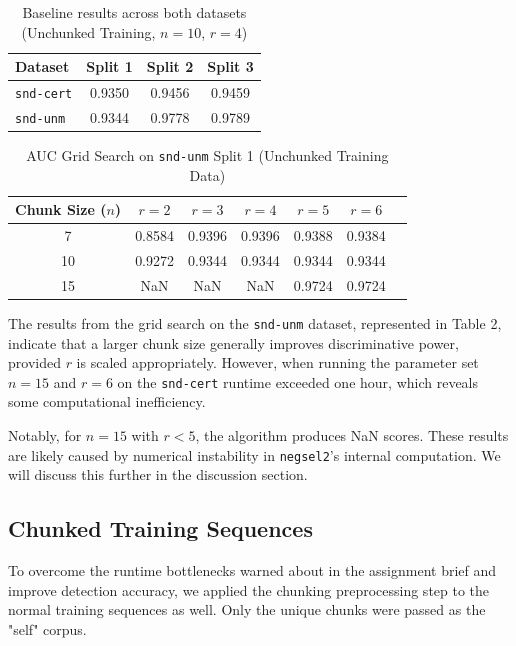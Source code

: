 \documentclass{article}
\begin{document}
\begin{table}[h]
\centering
\caption{Baseline results across both datasets (Unchunked Training, $n=10$, $r=4$)}
\begin{tabular}{l c c c}
\hline
\textbf{Dataset} & \textbf{Split 1} & \textbf{Split 2} & \textbf{Split 3} \\
\hline
\texttt{snd-cert} & 0.9350 & 0.9456 & 0.9459 \\
\texttt{snd-unm}  & 0.9344 & 0.9778 & 0.9789 \\
\hline
\end{tabular}
\end{table}

\begin{table}[h]
\centering
\caption{AUC Grid Search on \texttt{snd-unm} Split 1 (Unchunked Training Data)}
\begin{tabular}{c c c c c c c}
\hline
\textbf{Chunk Size ($n$)} & \textbf{$r=2$} & \textbf{$r=3$} & \textbf{$r=4$} & \textbf{$r=5$} & \textbf{$r=6$}\\
\hline
7  & 0.8584 & 0.9396 & 0.9396 & 0.9388 & 0.9384 \\
10 & 0.9272 & 0.9344 & 0.9344 & 0.9344 & 0.9344 \\
15 & NaN    & NaN    & NaN    & 0.9724 & 0.9724 \\
\hline
\end{tabular}
\end{table}

The results from the grid search on the \texttt{snd-unm} dataset, represented in Table 2, indicate that a larger chunk size generally improves discriminative power, provided $r$ is scaled appropriately. However, when running the parameter set $n=15$ and $r=6$ on the \texttt{snd-cert} runtime exceeded one hour, which reveals some computational inefficiency.

Notably, for $n=15$ with $r < 5$, the algorithm produces NaN scores. These results are likely caused by numerical instability in \texttt{negsel2}'s internal computation. We will discuss this further in the discussion section.

\subsection{Chunked Training Sequences}
To overcome the runtime bottlenecks warned about in the assignment brief and improve detection accuracy, we applied the chunking preprocessing step to the normal training sequences as well. Only the unique chunks were passed as the "self" corpus.
\end{document}
